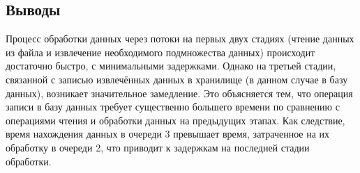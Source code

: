 \subsection*{Выводы}

\hspace{1.25cm}
Процесс обработки данных через потоки на первых двух стадиях (чтение данных из файла и извлечение необходимого подмножества данных) происходит достаточно быстро, с минимальными задержками. Однако на третьей стадии, связанной с записью извлечённых данных в хранилище (в данном случае в базу данных), возникает значительное замедление. Это объясняется тем, что операция записи в базу данных требует существенно большего времени по сравнению с операциями чтения и обработки данных на предыдущих этапах. Как следствие, время нахождения данных в очереди 3 превышает время, затраченное на их обработку в очереди 2, что приводит к задержкам на последней стадии обработки.

